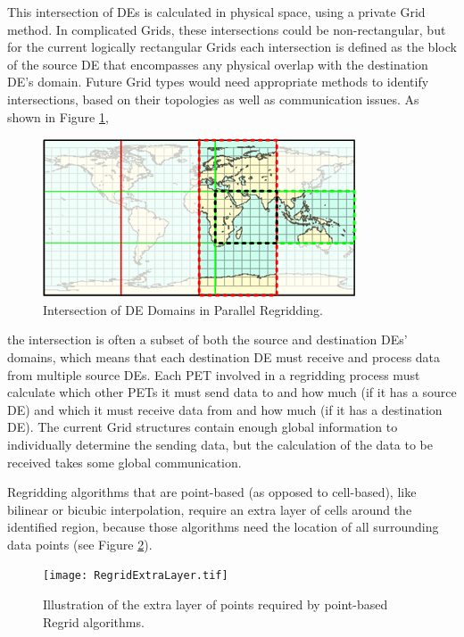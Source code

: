 This intersection of DEs is calculated in physical space, using a private Grid
method.  In complicated Grids, these intersections could be non-rectangular, but
for the current logically rectangular Grids each intersection is defined as the
block of the source DE that encompasses any physical overlap with the destination
DE's domain.  Future Grid types would need appropriate methods to identify
intersections, based on their topologies as well as communication issues.  As
shown in Figure \ref{fig:RegridIntersection}, 

\begin{center}
\begin{figure}
\caption{Intersection of DE Domains in Parallel Regridding. }
\label{fig:RegridIntersection}
\includegraphics{RegridIntersection.tif}
\end{figure}
\end{center}

the intersection is often a subset of both the source and destination DEs'
domains, which means that each destination DE must receive and process data from
multiple source DEs.  Each PET involved in a regridding process must calculate
which other PETs it must send data to and how much (if it has a source DE) and
which it must receive data from and how much (if it has a destination DE).  The
current Grid structures contain enough global information to individually
determine the sending data, but the calculation of the data to be received takes
some global communication.

Regridding algorithms that are point-based (as opposed to cell-based), like
bilinear or bicubic interpolation, require an extra layer of cells around the
identified region, because those algorithms need the location of all surrounding
data points (see Figure \ref{fig:RegridExtraLayer}).

\begin{center}
\begin{figure} 
\caption{Illustration of the extra layer of points required by point-based Regrid algorithms. }
\label{fig:RegridExtraLayer}
\texttt{[image: RegridExtraLayer.tif]}
\end{figure}
\end{center}

